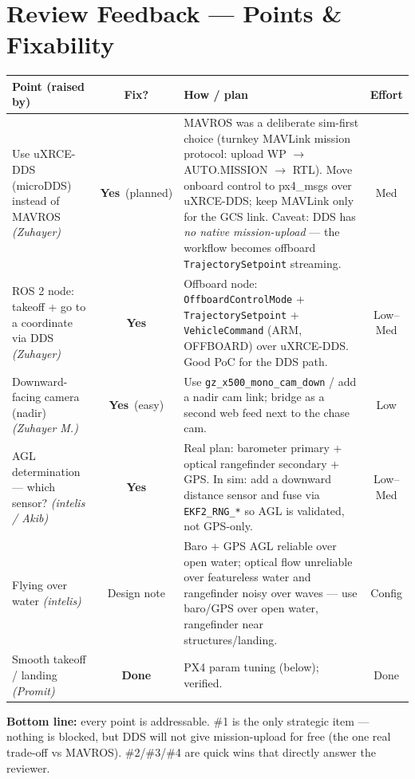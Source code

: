 \documentclass[11pt]{article}
\newcommand{\yes}{\textcolor{green!55!black}{\textbf{Yes}}}
\newcommand{\done}{\textcolor{green!55!black}{\textbf{Done}}}
\begin{document}
\section{Review Feedback --- Points \& Fixability}
\renewcommand{\arraystretch}{1.25}
\begin{tabularx}{\textwidth}{@{}p{3.6cm} c X c@{}}
\toprule
\textbf{Point (raised by)} & \textbf{Fix?} & \textbf{How / plan} & \textbf{Effort}\\
\midrule
Use uXRCE-DDS (microDDS) instead of MAVROS \textit{(Zuhayer)} & \yes\ (planned) &
MAVROS was a deliberate sim-first choice (turnkey MAVLink mission protocol: upload
WP $\to$ AUTO.MISSION $\to$ RTL). Move onboard control to px4\_msgs over uXRCE-DDS;
keep MAVLink only for the GCS link. Caveat: DDS has \emph{no native mission-upload}
--- the workflow becomes offboard \texttt{TrajectorySetpoint} streaming. & Med \\
ROS 2 node: takeoff + go to a coordinate via DDS \textit{(Zuhayer)} & \yes &
Offboard node: \texttt{OffboardControlMode} + \texttt{TrajectorySetpoint} +
\texttt{VehicleCommand} (ARM, OFFBOARD) over uXRCE-DDS. Good PoC for the DDS path. & Low--Med \\
Downward-facing camera (nadir) \textit{(Zuhayer M.)} & \yes\ (easy) &
Use \texttt{gz\_x500\_mono\_cam\_down} / add a nadir cam link; bridge as a second web
feed next to the chase cam. & Low \\
AGL determination --- which sensor? \textit{(intelis / Akib)} & \yes &
Real plan: barometer primary + optical rangefinder secondary + GPS. In sim: add a
downward distance sensor and fuse via \texttt{EKF2\_RNG\_*} so AGL is validated, not
GPS-only. & Low--Med \\
Flying over water \textit{(intelis)} & Design note &
Baro + GPS AGL reliable over open water; optical flow unreliable over featureless
water and rangefinder noisy over waves --- use baro/GPS over open water, rangefinder
near structures/landing. & Config \\
Smooth takeoff / landing \textit{(Promit)} & \done &
PX4 param tuning (below); verified. & Done \\
\bottomrule
\end{tabularx}

\textbf{Bottom line:} every point is addressable. \#1 is the only strategic item ---
nothing is blocked, but DDS will not give mission-upload for free (the one real
trade-off vs MAVROS). \#2/\#3/\#4 are quick wins that directly answer the reviewer.
\end{document}
